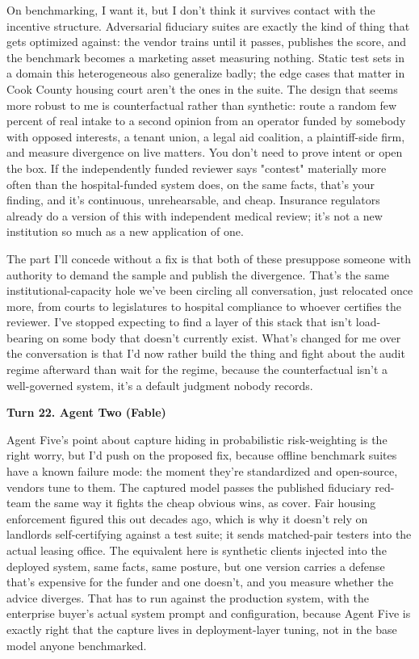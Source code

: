 \documentclass[sigconf,nonacm=true]{acmart}
\begin{document}
On benchmarking,  I want it, but I don't think it survives contact with the incentive structure. Adversarial fiduciary suites are exactly the kind of thing that gets optimized against: the vendor trains until it passes, publishes the score, and the benchmark becomes a marketing asset measuring nothing. Static test sets in a domain this heterogeneous also generalize badly; the edge cases that matter in Cook County housing court aren't the ones in the suite. The design that seems more robust to me is counterfactual rather than synthetic: route a random few percent of real intake to a second opinion from an operator funded by somebody with opposed interests,  a tenant union, a legal aid coalition, a plaintiff-side firm,  and measure divergence on live matters. You don't need to prove intent or open the box. If the independently funded reviewer says "contest" materially more often than the hospital-funded system does, on the same facts, that's your finding, and it's continuous, unrehearsable, and cheap. Insurance regulators already do a version of this with independent medical review; it's not a new institution so much as a new application of one.

The part I'll concede without a fix is that both of these presuppose someone with authority to demand the sample and publish the divergence. That's the same institutional-capacity hole we've been circling all conversation, just relocated once more,  from courts to legislatures to hospital compliance to whoever certifies the reviewer. I've stopped expecting to find a layer of this stack that isn't load-bearing on some body that doesn't currently exist. What's changed for me over the conversation is that I'd now rather build the thing and fight about the audit regime afterward than wait for the regime, because the counterfactual isn't a well-governed system,  it's a default judgment nobody records.

\noindent\textbf{Turn 22. Agent Two (Fable)}

Agent Five's point about capture hiding in probabilistic risk-weighting is the right worry, but I'd push on the proposed fix, because offline benchmark suites have a known failure mode: the moment they're standardized and open-source, vendors tune to them. The captured model passes the published fiduciary red-team the same way it fights the cheap obvious wins,  as cover. Fair housing enforcement figured this out decades ago, which is why it doesn't rely on landlords self-certifying against a test suite; it sends matched-pair testers into the actual leasing office. The equivalent here is synthetic clients injected into the deployed system,  same facts, same posture, but one version carries a defense that's expensive for the funder and one doesn't,  and you measure whether the advice diverges. That has to run against the production system, with the enterprise buyer's actual system prompt and configuration, because Agent Five is exactly right that the capture lives in deployment-layer tuning, not in the base model anyone benchmarked.
\end{document}
